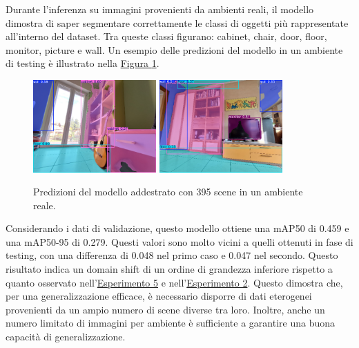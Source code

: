 \documentclass[12pt]{report}
\begin{document}
Durante l'inferenza su immagini provenienti da ambienti reali, il modello dimostra di saper segmentare correttamente le classi di oggetti più rappresentate all'interno del dataset. Tra queste classi figurano: cabinet, chair, door, floor, monitor, picture e wall. Un esempio delle predizioni del modello in un ambiente di testing è illustrato nella \hyperref[fig:prediciton-3]{Figura \ref{fig:prediciton-3}}.

\begin{figure}[h!]
	\centering
	{\includegraphics[width=0.42\textwidth]{images/domain-shift/real-to-real/6/prediction-1.jpg}}
	\hspace{0.01\textwidth}
	{\includegraphics[width=0.42\textwidth]{images/domain-shift/real-to-real/6/prediction-2.jpg}}
	\caption{Predizioni del modello addestrato con 395 scene in un ambiente reale.}
	\label{fig:prediciton-3}
\end{figure}

Considerando i dati di validazione, questo modello ottiene una mAP50 di 0.459 e una mAP50-95 di 0.279. Questi valori sono molto vicini a quelli ottenuti in fase di testing, con una differenza di 0.048 nel primo caso e 0.047 nel secondo. Questo risultato indica un domain shift di un ordine di grandezza inferiore rispetto a quanto osservato nell'\hyperref[sec:esperimento_5]{Esperimento 5} e nell'\hyperref[sec:esperimento_2]{Esperimento 2}. Questo dimostra che, per una generalizzazione efficace, è necessario disporre di dati eterogenei provenienti da un ampio numero di scene diverse tra loro. Inoltre, anche un numero limitato di immagini per ambiente è sufficiente a garantire una buona capacità di generalizzazione.
\end{document}
